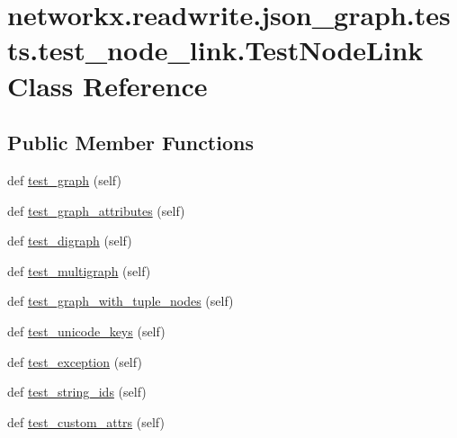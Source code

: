 \hypertarget{classnetworkx_1_1readwrite_1_1json__graph_1_1tests_1_1test__node__link_1_1TestNodeLink}{}\section{networkx.\+readwrite.\+json\+\_\+graph.\+tests.\+test\+\_\+node\+\_\+link.\+Test\+Node\+Link Class Reference}
\label{classnetworkx_1_1readwrite_1_1json__graph_1_1tests_1_1test__node__link_1_1TestNodeLink}
\subsection*{Public Member Functions}
\begin{DoxyCompactItemize}
\item 
def \hyperlink{classnetworkx_1_1readwrite_1_1json__graph_1_1tests_1_1test__node__link_1_1TestNodeLink_af1d7dafba2050d1bbafc76fd3c96c502}{test\+\_\+graph} (self)
\item 
def \hyperlink{classnetworkx_1_1readwrite_1_1json__graph_1_1tests_1_1test__node__link_1_1TestNodeLink_a3338f959184c1ea0773a33820f321231}{test\+\_\+graph\+\_\+attributes} (self)
\item 
def \hyperlink{classnetworkx_1_1readwrite_1_1json__graph_1_1tests_1_1test__node__link_1_1TestNodeLink_ad7f389068e1a4b9c12342418201bcb29}{test\+\_\+digraph} (self)
\item 
def \hyperlink{classnetworkx_1_1readwrite_1_1json__graph_1_1tests_1_1test__node__link_1_1TestNodeLink_aaec5ee9ab8609e473d54dc93578478d2}{test\+\_\+multigraph} (self)
\item 
def \hyperlink{classnetworkx_1_1readwrite_1_1json__graph_1_1tests_1_1test__node__link_1_1TestNodeLink_a70a4637f96cf766a113e85cea63444c9}{test\+\_\+graph\+\_\+with\+\_\+tuple\+\_\+nodes} (self)
\item 
def \hyperlink{classnetworkx_1_1readwrite_1_1json__graph_1_1tests_1_1test__node__link_1_1TestNodeLink_add5440d3e46073a4654f1b6730e96b31}{test\+\_\+unicode\+\_\+keys} (self)
\item 
def \hyperlink{classnetworkx_1_1readwrite_1_1json__graph_1_1tests_1_1test__node__link_1_1TestNodeLink_a634df7f504483163000305f73725eb78}{test\+\_\+exception} (self)
\item 
def \hyperlink{classnetworkx_1_1readwrite_1_1json__graph_1_1tests_1_1test__node__link_1_1TestNodeLink_aa548eb7ae822bd3b58d2aaab42064248}{test\+\_\+string\+\_\+ids} (self)
\item 
def \hyperlink{classnetworkx_1_1readwrite_1_1json__graph_1_1tests_1_1test__node__link_1_1TestNodeLink_adb0943be940f8b84512c614e76747bc0}{test\+\_\+custom\+\_\+attrs} (self)
\end{DoxyCompactItemize}


